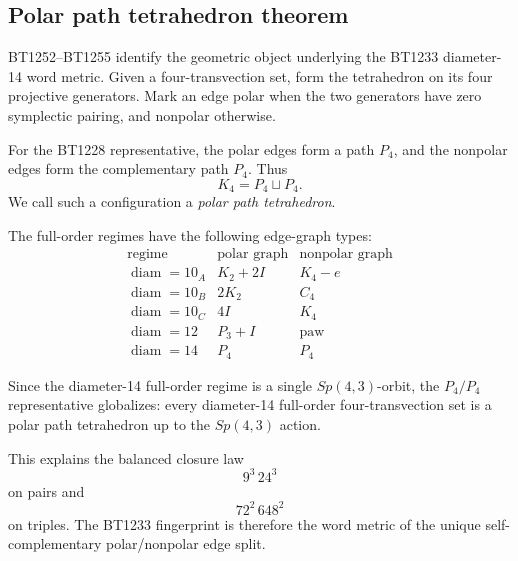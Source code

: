 \subsection{Polar path tetrahedron theorem}
\label{sec:bt1258-polar-path-tetrahedron}

BT1252--BT1255 identify the geometric object underlying the BT1233 diameter-14 word metric.  Given a four-transvection set, form the tetrahedron on its four projective generators.  Mark an edge polar when the two generators have zero symplectic pairing, and nonpolar otherwise.

For the BT1228 representative, the polar edges form a path \(P_4\), and the nonpolar edges form the complementary path \(P_4\).  Thus
\[
K_4=P_4\sqcup P_4.
\]
We call such a configuration a \emph{polar path tetrahedron}.

The full-order regimes have the following edge-graph types:
\[
\begin{array}{c|c|c}
\text{regime} & \text{polar graph} & \text{nonpolar graph}\\
\hline
\operatorname{diam}=10_A & K_2+2I & K_4-e\\
\operatorname{diam}=10_B & 2K_2 & C_4\\
\operatorname{diam}=10_C & 4I & K_4\\
\operatorname{diam}=12 & P_3+I & \mathrm{paw}\\
\operatorname{diam}=14 & P_4 & P_4
\end{array}
\]

Since the diameter-14 full-order regime is a single \(Sp(4,3)\)-orbit, the \(P_4/P_4\) representative globalizes: every diameter-14 full-order four-transvection set is a polar path tetrahedron up to the \(Sp(4,3)\) action.

This explains the balanced closure law
\[
9^3\,24^3
\]
on pairs and
\[
72^2\,648^2
\]
on triples.  The BT1233 fingerprint is therefore the word metric of the unique self-complementary polar/nonpolar edge split.
